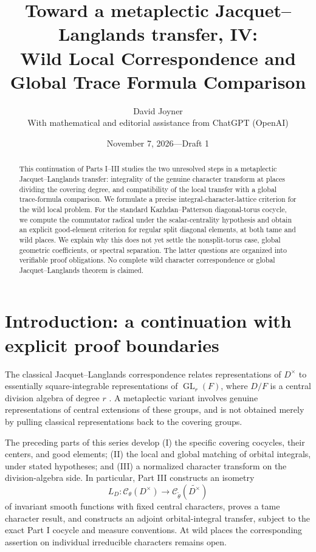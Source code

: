 \documentclass[11pt]{article}
\title{Toward a metaplectic Jacquet--Langlands transfer, IV:\\
Wild Local Correspondence and Global Trace Formula Comparison}
\author{David Joyner\\[3pt]
\normalsize With mathematical and editorial assistance from ChatGPT (OpenAI)}
\date{November 7, 2026\quad---\quad Draft 1}
\newcommand{\GL}{\operatorname{GL}}
\theoremstyle{plain}
\theoremstyle{definition}
\begin{document}
\maketitle
\begin{abstract}
This continuation of Parts I--III studies the two unresolved steps in a
metaplectic Jacquet--Langlands transfer: integrality of the genuine
character transform at places dividing the covering degree, and
compatibility of the local transfer with a global trace-formula
comparison.  We formulate a precise integral-character-lattice
criterion for the wild local problem.  For the standard
Kazhdan--Patterson diagonal-torus cocycle, we compute the commutator
radical under the scalar-centrality hypothesis and obtain an explicit
good-element criterion for regular split diagonal elements, at both
tame and wild places.  We explain why this does not yet settle the
nonsplit-torus case, global geometric coefficients, or spectral
separation.  The latter questions are organized into verifiable proof
obligations.  No complete wild character correspondence or global
Jacquet--Langlands theorem is claimed.
\end{abstract}
\tableofcontents

\section{Introduction: a continuation with explicit proof boundaries}\label{sec:intro}
The classical Jacquet--Langlands correspondence relates representations
of $D^\times$ to essentially square-integrable representations of
$\GL_r(F)$, where $D/F$ is a central division algebra of degree $r$
\cite{DKV}.  A metaplectic variant involves genuine representations of
central extensions of these groups, and is not obtained merely by
pulling classical representations back to the covering groups.

The preceding parts of this series develop (I) the specific covering
cocycles, their centers, and good elements; (II) the local and global
matching of orbital integrals, under stated hypotheses; and (III) a
normalized character transform on the division-algebra side.  In
particular, Part III constructs an isometry
\begin{equation}\label{eq:LD}
 L_D:\mathcal C_\theta(D^\times)\longrightarrow
 \mathcal C_{\widetilde\theta}(\widetilde{D^\times})
\end{equation}
of invariant smooth functions with fixed central characters, proves a
tame character result, and constructs an adjoint orbital-integral
transfer, subject to the exact Part I cocycle and measure conventions.
At wild places the corresponding assertion on individual irreducible
characters remains open.
\end{document}
